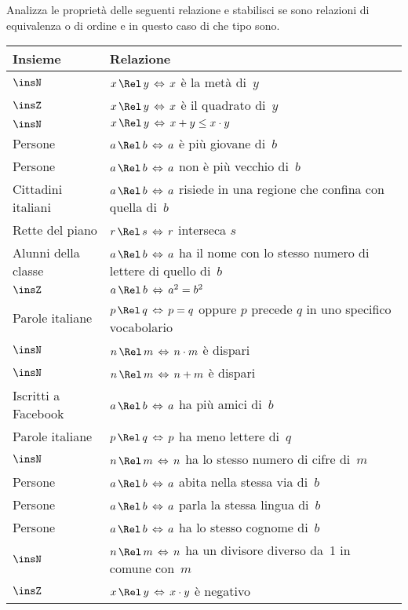 \begin{esercizio}
\label{ese:\thechapter.52}
Analizza le proprietà delle seguenti relazione e stabilisci se sono relazioni di equivalenza o di ordine e in questo caso di che tipo sono.
\begin{center}
\begin{tabular}{ll}
\toprule
Insieme & Relazione\\
\midrule
$\insN$ & $x \, \Rel \, y\, \Leftrightarrow\, x $ è la metà di~$ y $\\
$\insZ$ & $x \, \Rel \, y\, \Leftrightarrow\, x $ è il quadrato di~$ y $\\
$\insN$ & $x \, \Rel \, y\, \Leftrightarrow\, x+y\le x\cdot y $\\
Persone &$a \, \Rel \, b\, \Leftrightarrow\, a $ è più giovane di~$ b $ \\
Persone &$a \, \Rel \, b\, \Leftrightarrow\, a $ non è più vecchio di~$ b $ \\
Cittadini italiani &$a \, \Rel \, b\, \Leftrightarrow\, a $ risiede in una regione che confina con quella di~$ b $ \\
Rette del piano &$r \, \Rel \, s\, \Leftrightarrow\, r $ interseca $s$\\ 
Alunni della classe &$a \, \Rel \, b\, \Leftrightarrow\, a $ ha il nome con lo stesso numero di lettere di quello di~$ b $ \\
$\insZ$ & $a \, \Rel \, b\, \Leftrightarrow\, a^{2}=b^{2} $\\
Parole italiane & $p \, \Rel \, q\, \Leftrightarrow\, p=q $ oppure $ p $ precede $ q $ in uno specifico vocabolario\\
$\insN$ & $n \, \Rel \, m\, \Leftrightarrow\, n \cdot m $ è dispari\\
$\insN$ & $n \, \Rel \, m\, \Leftrightarrow\, n + m $ è dispari\\
Iscritti a Facebook &$a \, \Rel \, b\, \Leftrightarrow\, a $ ha più amici di~$ b $\\
Parole italiane & $p \, \Rel \, q\, \Leftrightarrow\, p $ ha meno lettere di~$ q $\\
$\insN$ & $n \, \Rel \, m\, \Leftrightarrow\, n $ ha lo stesso numero di cifre di~$ m $\\
Persone &$a \, \Rel \, b\, \Leftrightarrow\, a $ abita nella stessa via di~$ b $ \\
Persone &$a \, \Rel \, b\, \Leftrightarrow\, a $ parla la stessa lingua di~$ b $ \\
Persone &$a \, \Rel \, b\, \Leftrightarrow\, a $ ha lo stesso cognome di~$ b $ \\
$\insN$ & $n \, \Rel \, m\, \Leftrightarrow\, n $ ha un divisore diverso da~1 in comune con~$ m $\\
$\insZ$ & $x \, \Rel \, y\, \Leftrightarrow\, x\cdot y $ è negativo\\
\bottomrule
\end{tabular}
\end{center}
\end{esercizio}
